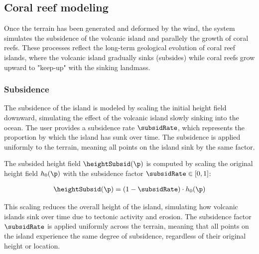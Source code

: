 \subsection{Coral reef modeling}
\label{sec:coral-island-coral-reef}


Once the terrain has been generated and deformed by the wind, the system simulates the subsidence of the volcanic island and parallely the growth of coral reefs. These processes reflect the long-term geological evolution of coral reef islands, where the volcanic island gradually sinks (subsides) while coral reefs grow upward to "keep-up" with the sinking landmass.

\subsubsection{Subsidence}
\label{sec:coral-island-subsidence}

The subsidence of the island is modeled by scaling the initial height field downward, simulating the effect of the volcanic island slowly sinking into the ocean. The user provides a subsidence rate $\subsidRate$, which represents the proportion by which the island has sunk over time. The subsidence is applied uniformly to the terrain, meaning all points on the island sink by the same factor.

The subsided height field $\heightSubsid(\p)$ is computed by scaling the original height field $h_0(\p)$ with the subsidence factor $\subsidRate \in [0, 1]$:

\begin{align}
    \heightSubsid(\p) = (1 - \subsidRate) \cdot h_0(\p)
\end{align}

This scaling reduces the overall height of the island, simulating how volcanic islands sink over time due to tectonic activity and erosion. The subsidence factor $\subsidRate$ is applied uniformly across the terrain, meaning that all points on the island experience the same degree of subsidence, regardless of their original height or location.

